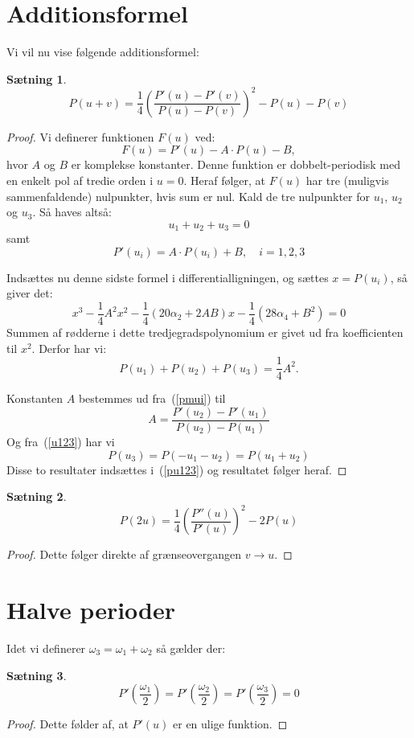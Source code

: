 \documentclass[12pt,oneside,a4paper]{article}
\newcommand{\be}{\begin{equation}}
\newcommand{\ee}{\end{equation}}
\newtheorem{thm}{Sætning}[section]
\begin{document}
\section{Additionsformel}
Vi vil nu vise følgende additionsformel:
\begin{thm}
    \be
    P(u+v) = \frac{1}{4} \left(\frac{P'(u)-P'(v)}{P(u)-P(v)}\right)^2 - P(u) - P(v)
    \ee
\end{thm}
\begin{proof}
    Vi definerer funktionen $F(u)$ ved:
    \be
    F(u) = P'(u) - A\cdot P(u) - B,
    \ee
    hvor $A$ og $B$ er komplekse konstanter.
    Denne funktion er dobbelt-periodisk med en enkelt pol af tredie orden i $u=0$. Heraf følger, at $F(u)$ har tre (muligvis sammenfaldende) nulpunkter, hvis sum er nul. Kald de tre nulpunkter for $u_1$, $u_2$ og $u_3$. Så haves altså:
    $$
    u_1 + u_2 + u_3 = 0
    \label{u123}
    $$
    samt
    \be
    P'(u_i) = A\cdot P(u_i) + B, \quad i=1,2,3
    \label{pmui}
    \ee

    Indsættes nu denne sidste formel i differentialligningen, og sættes $x=P(u_i)$, så giver det:
    $$
    x^3 - \frac 14 A^2 x^2 - \frac 14 (20 \alpha_2 + 2AB) x - \frac 14 (28\alpha_4 + B^2) = 0
    $$
    Summen af rødderne i dette tredjegradspolynomium er givet ud fra koefficienten til $x^2$. Derfor har vi:
    \be
    P(u_1) + P(u_2) + P(u_3) = \frac 14 A^2.
    \label{pu123}
    \ee

    Konstanten $A$ bestemmes ud fra~(\ref{pmui}) til
    $$
    A = \frac{P'(u_2)-P'(u_1)}{P(u_2)-P(u_1)}
    $$
    Og fra~(\ref{u123}) har vi
    $$
    P(u_3) = P(-u_1-u_2) = P(u_1+u_2)
    $$
    Disse to resultater indsættes i~(\ref{pu123}) og resultatet følger heraf.
\end{proof}
\begin{thm}
    \be
    P(2u) = \frac 14 \left(\frac{P''(u)}{P'(u)}\right)^2 - 2P(u)
    \ee
\end{thm}
\begin{proof}
    Dette følger direkte af grænseovergangen $v\rightarrow u$.
\end{proof}

\section{Halve perioder}
Idet vi definerer $\omega_3 = \omega_1 + \omega_2$ så gælder der:
\begin{thm}
    $$
    P'\left(\frac{\omega_1}{2}\right) =
    P'\left(\frac{\omega_2}{2}\right) =
    P'\left(\frac{\omega_3}{2}\right) = 0
    $$
\end{thm}
\begin{proof}
    Dette følder af, at $P'(u)$ er en ulige funktion.
\end{proof}
\end{document}
